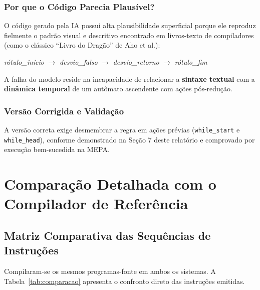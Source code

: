 \documentclass[12pt,a4paper]{article}
\begin{document}
\subsubsection{Por que o Código Parecia Plausível?}

O código gerado pela IA possui alta plausibilidade superficial porque ele
reproduz fielmente o padrão visual e descritivo encontrado em livros-texto de
compiladores (como o clássico ``Livro do Dragão'' de Aho et al.):
\begin{center}
\textit{rótulo\_início} $\rightarrow$ \textit{desvio\_falso} $\rightarrow$ \textit{desvio\_retorno} $\rightarrow$ \textit{rótulo\_fim}
\end{center}
A falha do modelo reside na incapacidade de relacionar a \textbf{sintaxe textual}
com a \textbf{dinâmica temporal} de um autômato ascendente com ações pós-redução.

\subsubsection{Versão Corrigida e Validação}

A versão correta exige desmembrar a regra em ações prévias (\texttt{while\_start} e
\texttt{while\_head}), conforme demonstrado na Seção 7 deste relatório e comprovado
por execução bem-sucedida na MEPA.

\section{Comparação Detalhada com o Compilador de Referência}

\subsection{Matriz Comparativa das Sequências de Instruções}

Compilaram-se os mesmos programas-fonte em ambos os sistemas. A Tabela~\ref{tab:comparacao}
apresenta o confronto direto das instruções emitidas.
\end{document}
